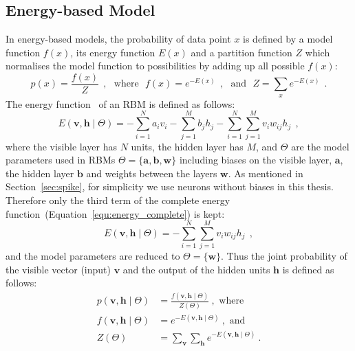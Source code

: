 \subsection{Energy-based Model}
In energy-based models, the probability of data point $x$ is defined by a model function $f(x)$, its energy function $E(x)$ and a partition function $Z$ which normalises the model function to possibilities by adding up all possible $f(x)$:
\begin{equation}
 p(x) = \dfrac{f(x)}{Z}~~, \textrm{~~where~~} f(x) =e^{-E(x)}~~,  \textrm{~~and~~}
 Z = \sum_{x} e^{-E(x)}~~.
\end{equation} 
The energy function~\citep{hopfield1982neural} of an RBM is defined as follows:
\begin{equation}
E(\mathbf{v}, \mathbf{h} \mid \Theta)= -\sum_{i=1}^N a_i v_i - \sum_{j=1}^M b_j h_j - \sum_{i=1}^N \sum_{j=1}^M v_i w_{ij} h_j~~,
\label{equ:energy_complete}
\end{equation}
where the visible layer has $ N $ units, the hidden layer has $ M $, and $ \Theta$ are the model parameters used in RBMs $ \Theta =\{\mathbf{a}, \mathbf{b}, \mathbf{w}\} $ including biases on the visible layer, $\mathbf{a}$, the hidden layer $\mathbf{b}$ and weights between the layers $\mathbf{w}$.
As mentioned in Section~\ref{sec:spike}, for simplicity we use neurons without biases in this thesis.
Therefore only the third term of the complete energy function~(Equation~\ref{equ:energy_complete}) is kept:
\begin{equation}
E(\mathbf{v}, \mathbf{h} \mid \Theta)= - \sum_{i=1}^N \sum_{j=1}^M v_i w_{ij} h_j~~,
\label{equ:rbm_energy}
\end{equation}
and the model parameters are reduced to  $ \Theta = \{\mathbf{w}\} $.
Thus the joint probability of the visible vector (input) $\mathbf{v}$ and the output of the hidden units $\mathbf{h}$ is defined as follows: 
\begin{equation}
\begin{aligned}
p(\mathbf{v}, \mathbf{h} \mid \Theta) &=\frac{f(\mathbf{v}, \mathbf{h} \mid \Theta)}{Z(\Theta)}~,  \textrm{~where~} \\
f(\mathbf{v}, \mathbf{h} \mid \Theta) &=e^{-E(\mathbf{v}, \mathbf{h} \mid \Theta)}~,  \textrm{~and~} \\
Z(\Theta) &= \sum_{\mathbf{v}} \sum_{\mathbf{h}} e^{-E(\mathbf{v}, \mathbf{h} \mid \Theta)}~.
\end{aligned}
\label{equ:rbm_prob}
\end{equation}

